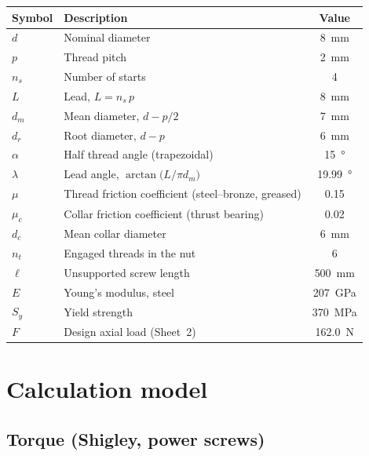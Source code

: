 \documentclass[11pt]{article}
\begin{document}
\begin{center}
\begin{tabular}{@{}llc@{}}
\toprule
\textbf{Symbol} & \textbf{Description} & \textbf{Value} \\
\midrule
$d$        & Nominal diameter                       & \SI{8}{\milli\metre} \\
$p$        & Thread pitch                           & \SI{2}{\milli\metre} \\
$n_s$      & Number of starts                       & 4 \\
$L$        & Lead, $L=n_s\,p$                       & \SI{8}{\milli\metre} \\
$d_m$      & Mean diameter, $d-p/2$                 & \SI{7}{\milli\metre} \\
$d_r$      & Root diameter, $d-p$                   & \SI{6}{\milli\metre} \\
$\alpha$   & Half thread angle (trapezoidal)        & \SI{15}{\degree} \\
$\lambda$  & Lead angle, $\arctan\!\bigl(L/\pi d_m\bigr)$ & \SI{19.99}{\degree} \\
$\mu$      & Thread friction coefficient (steel--bronze, greased) & 0.15 \\
$\mu_c$    & Collar friction coefficient (thrust bearing) & 0.02 \\
$d_c$      & Mean collar diameter                   & \SI{6}{\milli\metre} \\
$n_t$      & Engaged threads in the nut             & 6 \\
$\ell$     & Unsupported screw length               & \SI{500}{\milli\metre} \\
$E$        & Young's modulus, steel                 & \SI{207}{\giga\pascal} \\
$S_y$      & Yield strength                         & \SI{370}{\mega\pascal} \\
$F$        & Design axial load (Sheet~2)            & \SI{162.0}{\newton} \\
\bottomrule
\end{tabular}
\end{center}

\section{Calculation model}\label{sec:scr-model}

\subsection{Torque (Shigley, power screws)}
\end{document}
